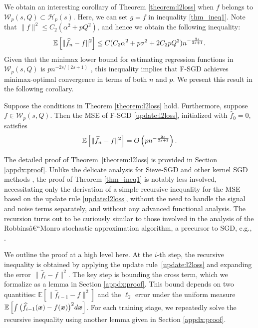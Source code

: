 We obtain an interesting corollary of Theorem \ref{theorem:l2loss} when $f$ belongs to $\mathcal{W}_p(s, Q)  \subset \mathcal{H}_p(s)$. Here, we can set $g = f$ in inequality \eqref{thm_ineq1}. Note that $\|f\|^2 \leq C_2(\alpha^2 + pQ^2)$, and hence we obtain the following inequality:
\begin{align*}
     \mathbb{E} \left[\| \widehat{f}_n - f\|^2 \right] \leq C(C_2\alpha^2+p\sigma^2+2C_2pQ^2)n^{-\frac{2s}{2s+1}}.
\end{align*}
Given that the minimax lower bound for estimating regression functions in $ \mathcal{W}_p(s, Q)$ is $pn^{-2s/(2s+1)}$ \citep{raskutti2009lower}, this inequality implies that F-SGD achieves minimax-optimal convergence in terms of both $ n $ and $ p $. We present this result in the following corollary.
\begin{corollary}\label{cor:W}
    Suppose the conditions in Theorem \ref{theorem:l2loss} hold. Furthermore, suppose $f \in \mathcal{W}_p(s, Q)$. Then the MSE of F-SGD \eqref{update:l2loss}, initialized with $\hat f_0 = 0$, satisfies
    \begin{align*}
        \mathbb{E} \left[ \| \widehat{f}_n - f\|^2 \right] = O\left(pn^{-\frac{2s}{2s+1}}\right).
    \end{align*}
\end{corollary}
The detailed proof of Theorem~\ref{theorem:l2loss} is provided in Section \ref{appdx:proof}. Unlike the delicate analysis for Sieve-SGD \citep{zhang2022sieve} and other kernel SGD methods \citep{4406a3ce-1e59-3ed8-8c25-9f7d75b81f14, 6842642}, the proof of Theorem \ref{thm_ineq1} is notably less involved, necessitating only the derivation of a simple recursive inequality for the MSE based on the update rule \eqref{update:l2loss}, without the need to handle the signal and noise terms separately, and without any advanced functional analysis. The recursion turns out to be curiously similar to those involved in the analysis of the Robbinsâ€“Monro stochastic approximation algorithm, a precursor to SGD, e.g., \citep[Lemma 1]{chung1954stochastic}.

We outline the proof at a high level here. 
At the $i$-th step, the recursive inequality is obtained by applying the update rule~\eqref{update:l2loss} 
and expanding the error $\|\hat{f}_i - f\|^2$. 
The key step is bounding the cross term, which we formalize as a lemma in Section \ref{appdx:proof}. This bound depends on two quantities: $\mathbb{E}[\|\hat{f}_{i-1} - f\|^2]$ and the $\ell_2$ error under the uniform measure 
$\mathbb{E}\left[ \int \big( \widehat{f}_{i-1}(\boldsymbol{x}) - f(\boldsymbol{x}) \big)^2 d\boldsymbol{x} \right]$. 
For each training stage, we repeatedly solve the recursive inequality using another lemma given in Section \ref{appdx:proof}.



